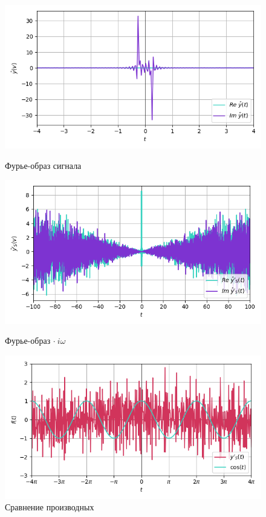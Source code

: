\documentclass[a4paper]{article}
\begin{document}
\begin{figure}[H]
    \begin{minipage}{0.33\textwidth}
        \centering \includegraphics[width=\textwidth]{sources/first/6_wider_fft.png}
        \caption{Фурье-образ сигнала}
    \end{minipage}\hfill
    \begin{minipage}{0.33\textwidth}
        \centering \includegraphics[width=\textwidth]{sources/first/7_wider_spectral_fft.png}
        \caption{Фурье-образ $\cdot\ i\omega$}
    \end{minipage}\hfill
    \begin{minipage}{0.33\textwidth}
        \centering \includegraphics[width=\textwidth]{sources/first/8_wider_diff_cmp.png}
        \caption{Сравнение производных}
    \end{minipage}
\end{figure}
\end{document}
